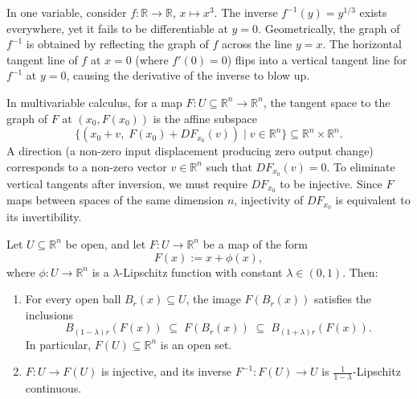 \begin{remark}
\label{rem:inverse_function_theorem_intuition}
In one variable, consider $f : \mathbb{R} \to \mathbb{R}$, $x \mapsto x^3$. The inverse $f^{-1}(y) = y^{1/3}$ exists everywhere, yet it fails to be differentiable at $y = 0$. Geometrically, the graph of $f^{-1}$ is obtained by reflecting the graph of $f$ across the line $y = x$. The horizontal tangent line of $f$ at $x = 0$ (where $f'(0) = 0$) flips into a vertical tangent line for $f^{-1}$ at $y = 0$, causing the derivative of the inverse to blow up.

In multivariable calculus, for a map $F : U \subseteq \mathbb{R}^n \to \mathbb{R}^n$, the tangent space to the graph of $F$ at $(x_0, F(x_0))$ is the affine subspace
\[
\big\{(x_0 + v, \; F(x_0) + DF_{x_0}(v)) \mid v \in \mathbb{R}^n\big\} \subseteq \mathbb{R}^n \times \mathbb{R}^n.
\]
A  direction (a non-zero input displacement producing zero output change) corresponds to a non-zero vector $v \in \mathbb{R}^n$ such that $DF_{x_0}(v) = 0$. To eliminate vertical tangents after inversion, we must require $DF_{x_0}$ to be injective. Since $F$ maps between spaces of the same dimension $n$, injectivity of $DF_{x_0}$ is equivalent to its invertibility.
\end{remark}

\begin{lemma}
\label{lem:lipschitz_perturbation_identity}
Let $U \subseteq \mathbb{R}^n$ be open, and let $F : U \to \mathbb{R}^n$ be a map of the form
\[
F(x) := x + \phi(x),
\]
where $\phi : U \to \mathbb{R}^n$ is a $\lambda$-Lipschitz function with constant $\lambda \in (0,1)$. Then:
\begin{enumerate}[label=\textbf{(\alph*)}]
  \item For every open ball $B_r(x) \subseteq U$, the image $F(B_r(x))$ satisfies the inclusions
    \[
    B_{(1-\lambda)r}(F(x)) \;\subseteq\; F(B_r(x)) \;\subseteq\; B_{(1+\lambda)r}(F(x)).
    \]
    In particular, $F(U) \subseteq \mathbb{R}^n$ is an open set.
  \item $F : U \to F(U)$ is injective, and its inverse $F^{-1} : F(U) \to U$ is $\frac{1}{1-\lambda}$-Lipschitz continuous.
\end{enumerate}
\end{lemma}

